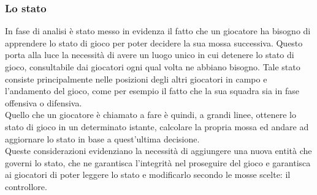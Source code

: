 \subsubsection{Lo stato}
\label{sec:entita_coinvolte_stato}

In fase di analisi è stato messo in evidenza il fatto che un giocatore ha bisogno di apprendere lo stato di gioco per poter decidere la sua mossa successiva. Questo porta alla luce la necessità di avere un luogo unico in cui detenere lo stato di gioco, consultabile dai giocatori ogni qual volta ne abbiano bisogno. Tale stato consiste principalmente nelle posizioni degli altri giocatori in campo e l'andamento del gioco, come per esempio il fatto che la sua squadra sia in fase offensiva o difensiva.\\

Quello che un giocatore è chiamato a fare è quindi, a grandi linee, ottenere lo stato di gioco in un determinato istante, calcolare la propria mossa ed andare ad aggiornare lo stato in base a quest'ultima decisione.\\

Queste considerazioni evidenziano la necessità di aggiungere una nuova entità che governi lo stato, che ne garantisca l'integrità nel proseguire del gioco e garantisca ai giocatori di poter leggere lo stato e modificarlo secondo le mosse scelte: il controllore.
